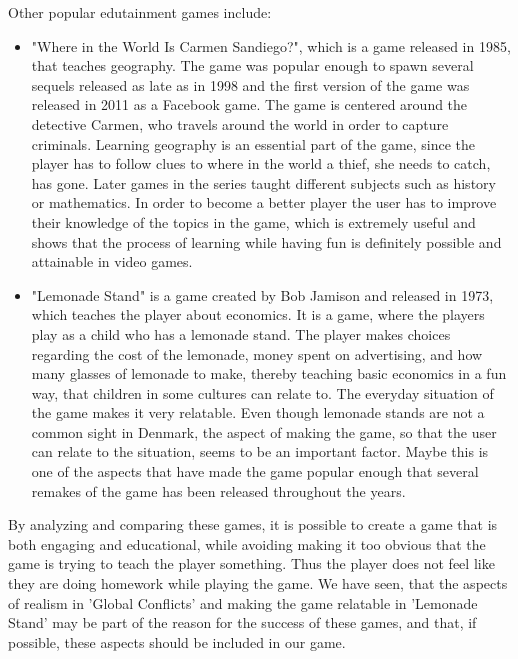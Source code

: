 Other popular edutainment games include:
\begin{itemize}
\item "Where in the World Is Carmen Sandiego?", which is a game released in 1985, that teaches geography.
The game was popular enough to spawn several sequels released as late as in 1998 and the first version of the game was released in 2011 as a Facebook game.\cite{carmensandiego}
The game is centered around the detective Carmen, who travels around the world in order to capture criminals.
Learning geography is an essential part of the game, since the player has to follow clues to where in the world a thief, she needs to catch, has gone. Later games in the series taught different subjects such as history or mathematics. In order to become a better player the user has to improve their knowledge of the topics in the game, which is extremely useful and shows that the process of learning while having fun is definitely possible and attainable in video games.

\item "Lemonade Stand" is a game created by Bob Jamison and released in 1973, which teaches the player about economics.\cite{lemonadestand}
It is a game, where the players play as a child who has a lemonade stand.
The player makes choices regarding the cost of the lemonade, money spent on advertising, and how many glasses of lemonade to make, thereby teaching basic economics in a fun way, that children in some cultures can relate to.
The everyday situation of the game makes it very relatable. 
Even though lemonade stands are not a common sight in Denmark, the aspect of making the game, so that the user can relate to the situation, seems to be an important factor.
Maybe this is one of the aspects that have made the game popular enough that several remakes of the game has been released throughout the years.
\end{itemize}

By analyzing and comparing these games, it is possible to create a game that is both engaging and educational, while avoiding making it too obvious that the game is trying to teach the player something.
Thus the player does not feel like they are doing homework while playing the game.
We have seen, that the aspects of realism in 'Global Conflicts' and making the game relatable in 'Lemonade Stand' may be part of the reason for the success of these games, and that, if possible, these aspects should be included in our game.

